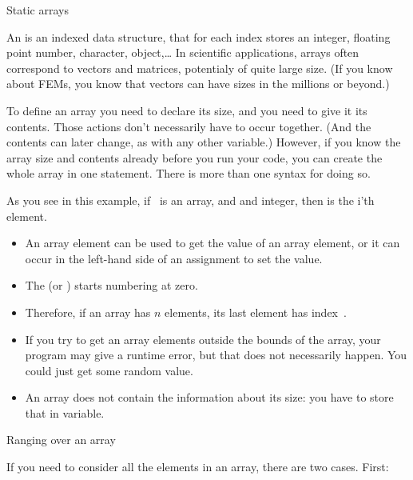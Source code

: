
 {Static arrays}
\label{sec:staticarray}

An  is an indexed data structure, that for each
index stores an integer, floating point number, character,
object,\ldots
In scientific applications, arrays often correspond to vectors and
matrices, potentialy of quite large size. (If you know about
\acfp{FEM}, you know that vectors can have sizes in the millions or beyond.)

To define an array you need to declare its size, and you need to give
it its contents. Those actions don't necessarily have to occur
together. (And the contents can later change, as with any other variable.)
However, 
if you know the array size and contents already before you run your
code, you can create the whole array in one statement. There is more
than one syntax for doing so.
%

As you see in this example, if ~is an array, and  and
integer, then  is the i'th element.
\begin{itemize}
\item An array element  can be used to get the value of an
  array element, or it can occur in the left-hand side of an
  assignment to set the value.
\item The  (or
  )  starts numbering at zero.
\item Therefore, if an array has $n$ elements, its last element has
  index~.
\item If you try to get an array elements outside the bounds of the
  array, your program may give a runtime error, but that does not
  necessarily happen. You could just get some random value.
\item An array does not contain the information about its size: you
  have to store that in variable.
\end{itemize}

 {Ranging over an array}
\label{sec:arrayrange}

If you need to consider all the elements in an array, there are two
cases. First:


